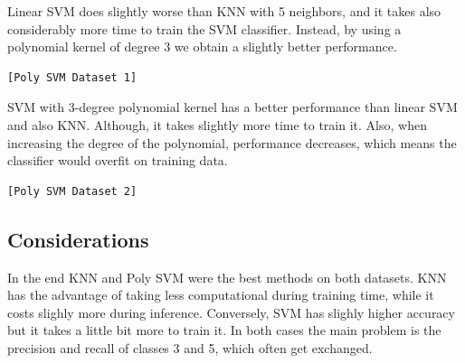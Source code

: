 \documentclass[12pt,a4paper,oneside]{article}
\begin{document}
Linear SVM does slightly worse than KNN with 5 neighbors, and it takes also
considerably more time to train the SVM classifier. Instead, by using a
polynomial kernel of degree 3 we obtain a slightly better performance.

\begin{verbatim}[Poly SVM Dataset 1]
\end{verbatim}

SVM with 3-degree polynomial kernel has a better performance than linear SVM and
also KNN. Although, it takes slightly more time to train it. Also, when
increasing the degree of the polynomial, performance decreases, which means the
classifier would overfit on training data.

\begin{verbatim}[Poly SVM Dataset 2]
\end{verbatim}

\subsection{Considerations}

In the end KNN and Poly SVM were the best methods on both datasets. KNN has the
advantage of taking less computational during training time, while it costs
slighly more during inference. Conversely, SVM has slighly higher accuracy but
it takes a little bit more to train it. In both cases the main problem is the
precision and recall of classes 3 and 5, which often get exchanged.



\nocite{*}  %
\end{document}
